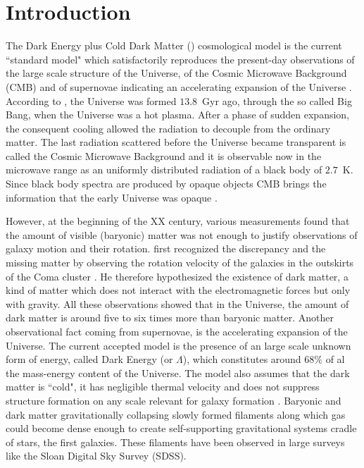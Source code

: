 
\chapter{Introduction}
\label{ch:introduction}

The Dark Energy plus Cold Dark Matter (\lcdm{}) cosmological model is the current ``standard model" which satisfactorily reproduces the present-day observations of the large scale structure of the Universe, of the Cosmic Microwave Background (CMB) and of supernovae indicating an accelerating expansion of the Universe \citep{Riess1998}.
According to \lcdm{}, the Universe was formed $13.8$~Gyr ago, through the so called Big Bang, when the Universe was a hot plasma.
After a phase of sudden expansion, the consequent cooling allowed the radiation to decouple from the ordinary matter.
The last radiation scattered before the Universe became transparent is called the Cosmic Microwave Background and it is observable now in the microwave range as an uniformly distributed radiation of a black body of $2.7$~K.
Since black body spectra are produced by opaque objects CMB brings the information that the early Universe was opaque \citep{Ryden2003}.

However, at the beginning of the XX century, various measurements found that the amount of visible (baryonic) matter was not enough to justify observations of galaxy motion and their rotation.
\citet{Zwicky1933} first recognized the discrepancy and the missing matter by observing the rotation velocity of the galaxies in the outskirts of the Coma cluster \citep{Zwicky1937}.
He therefore hypothesized the existence of dark matter, a kind of matter which does not interact with the electromagnetic forces but only with gravity.
All these observations showed that in the Universe, the amount of dark matter is around five to six times more than baryonic matter.
Another observational fact coming from supernovae, is the accelerating expansion of the Universe.
The current accepted model is the presence of an large scale unknown form of energy, called Dark Energy (or $\Lambda$), which constitutes around 68\% of al the mass-energy content of the Universe.
The \lcdm{} model also assumes that the dark matter is ``cold", \ie{} it has negligible thermal velocity and does not suppress structure formation on any scale relevant for galaxy formation \citep{Bullock2017}.
Baryonic and dark matter gravitationally collapsing slowly formed filaments along which gas could become dense enough to create self-supporting gravitational systems cradle of stars, the first galaxies.
These filaments have been observed in large surveys like the Sloan Digital Sky Survey (SDSS). %

